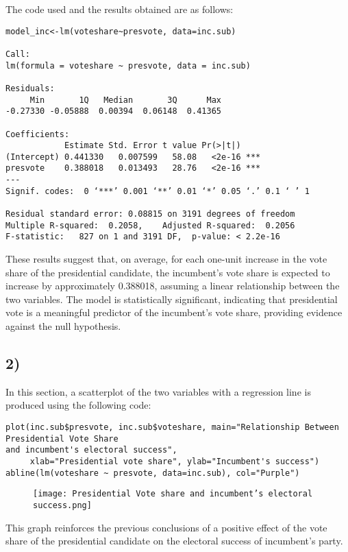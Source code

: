 \documentclass[oneside]{article}
\begin{document}
\hspace{1}

The code used and the results obtained are as follows:
\begin{verbatim}
model_inc<-lm(voteshare~presvote, data=inc.sub)

Call:
lm(formula = voteshare ~ presvote, data = inc.sub)

Residuals:
     Min       1Q   Median       3Q      Max 
-0.27330 -0.05888  0.00394  0.06148  0.41365 

Coefficients:
            Estimate Std. Error t value Pr(>|t|)    
(Intercept) 0.441330   0.007599   58.08   <2e-16 ***
presvote    0.388018   0.013493   28.76   <2e-16 ***
---
Signif. codes:  0 ‘***’ 0.001 ‘**’ 0.01 ‘*’ 0.05 ‘.’ 0.1 ‘ ’ 1

Residual standard error: 0.08815 on 3191 degrees of freedom
Multiple R-squared:  0.2058,	Adjusted R-squared:  0.2056 
F-statistic:   827 on 1 and 3191 DF,  p-value: < 2.2e-16
\end{verbatim}

These results suggest that, on average, for each one-unit increase in the vote share of the presidential candidate, the incumbent's vote share is expected to increase by approximately 0.388018, assuming a linear relationship between the two variables. The model is statistically significant, indicating that presidential vote is a meaningful predictor of the incumbent's vote share, providing evidence against the null hypothesis.

\subsection*{2)}

In this section, a scatterplot of the two variables with a regression line is produced using the following code:
\begin{verbatim}
plot(inc.sub$presvote, inc.sub$voteshare, main="Relationship Between Presidential Vote Share
and incumbent's electoral success", 
     xlab="Presidential vote share", ylab="Incumbent's success")
abline(lm(voteshare ~ presvote, data=inc.sub), col="Purple")

\end{verbatim}

\begin{figure} [h]
    \centering
    \texttt{[image: Presidential Vote share and incumbent's electoral success.png]}
    
    
\end{figure}
This graph reinforces the previous conclusions of a positive effect of the vote share of the presidential candidate on the electoral success of incumbent's party.
\end{document}
